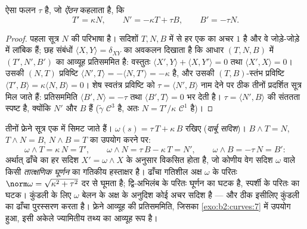 \begin{theorem}[अवकाश में फ्रेने सूत्र]\label{thm:b2:curves:frenet3d}
ऐसा  फलन $\tau$ है, जो \emph{ऐंठन} कहलाता है, कि
\[
T' = \kappa N, \qquad
N' = -\kappa T + \tau B, \qquad
B' = -\tau N .
\]
\end{theorem}

\begin{proof}
पहला सूत्र $N$ की परिभाषा है। सदिशों
$T, N, B$ में से हर एक का  अचर $1$ है और वे जोड़े-जोड़े में
लांबिक हैं; छह संबंधों $\langle X, Y\rangle = \delta_{XY}$ का अवकलन दिखाता
है कि आधार $(T, N, B)$ में $(T', N', B')$ का आव्यूह प्रतिसममित है: वस्तुतः
$\langle X', Y\rangle + \langle X, Y'\rangle = 0$ तथा
$\langle X', X\rangle = 0$। उसकी $(N, T)$ प्रविष्टि $\langle N', T\rangle =
-\langle N, T'\rangle = -\kappa$ है, और उसकी $(T, B)$-स्तंभ
प्रविष्टि $\langle T', B\rangle = \kappa\langle N, B\rangle = 0$। शेष स्वतंत्र प्रविष्टि को
$\tau = \langle N', B\rangle$ नाम देने पर ठीक तीनों प्रदर्शित सूत्र मिल जाते हैं:
प्रतिसममिति $\langle B', N\rangle = -\tau$ तथा
$\langle B', T\rangle = 0$ भर देती है। $\tau = \langle N', B\rangle$ की संततता स्पष्ट है,
क्योंकि $N'$ और $B$  हैं ($\tilde\gamma$ $\mathcal{C}^3$ है, अतः
$N = T'/\kappa$ $\mathcal{C}^1$ है)।
\end{proof}

\begin{example}[दार्बू सदिश]\label{ex:b2:curves:darboux}
तीनों फ्रेने सूत्र एक में सिमट जाते हैं। $\omega(s) =
\tau\,T + \kappa\,B$ रखिए (\emph{दार्बू सदिश})। $B
\wedge T = N$, $T \wedge N = B$, $N \wedge B = T$ का उपयोग करने पर:
\[
\omega \wedge T = \kappa\,N = T', \qquad
\omega \wedge N = \tau\,B - \kappa\,T = N', \qquad
\omega \wedge B = -\tau\,N = B' :
\]
अर्थात् ढाँचे का हर सदिश $X' = \omega \wedge X$ के अनुसार विकसित होता है, जो
कोणीय वेग सदिश $\omega$ वाले किसी \emph{तात्क्षणिक घूर्णन} का
गतिकीय हस्ताक्षर है। ढाँचा गतिशील अक्ष $\omega$ के परितः
$\norm\omega = \sqrt{\kappa^2 + \tau^2}$ दर से घूमता है; 
द्वि-अभिलंब के परितः घूर्णन का घटक है,  स्पर्शी के परितः का
घटक। कुंडली के लिए $\omega$ बेलन के अक्ष के अनुदिश कोई अचर सदिश है
--- और ठीक इसीलिए कुंडली का ढाँचा  पुरस्सरण करता है।
फ्रेने आव्यूह की प्रतिसममिति, जिसका \cref{exo:b2:curves:7} में उपयोग हुआ,
इसी अकेले ज्यामितीय तथ्य का आव्यूह रूप है।
\end{example}

